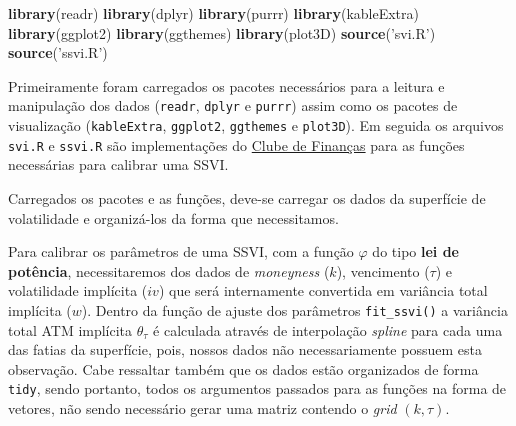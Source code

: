 \documentclass[]{book}
\newenvironment{Shaded}{\begin{snugshade}}{\end{snugshade}}
\newcommand{\KeywordTok}[1]{\textcolor[rgb]{0.13,0.29,0.53}{\textbf{#1}}}
\newcommand{\DataTypeTok}[1]{\textcolor[rgb]{0.13,0.29,0.53}{#1}}
\newcommand{\DecValTok}[1]{\textcolor[rgb]{0.00,0.00,0.81}{#1}}
\newcommand{\StringTok}[1]{\textcolor[rgb]{0.31,0.60,0.02}{#1}}
\newcommand{\OperatorTok}[1]{\textcolor[rgb]{0.81,0.36,0.00}{\textbf{#1}}}
\newcommand{\NormalTok}[1]{#1}
\theoremstyle{definition}
\theoremstyle{definition}
\theoremstyle{definition}
\theoremstyle{remark}
\begin{document}
\begin{Shaded}
\begin{Highlighting}[]
\KeywordTok{library}\NormalTok{(readr)}
\KeywordTok{library}\NormalTok{(dplyr)}
\KeywordTok{library}\NormalTok{(purrr)}
\KeywordTok{library}\NormalTok{(kableExtra)}
\KeywordTok{library}\NormalTok{(ggplot2)}
\KeywordTok{library}\NormalTok{(ggthemes)}
\KeywordTok{library}\NormalTok{(plot3D)}
\KeywordTok{source}\NormalTok{(}\StringTok{'svi.R'}\NormalTok{)}
\KeywordTok{source}\NormalTok{(}\StringTok{'ssvi.R'}\NormalTok{)}
\end{Highlighting}
\end{Shaded}

Primeiramente foram carregados os pacotes necessários para a leitura e
manipulação dos dados (\texttt{readr}, \texttt{dplyr} e \texttt{purrr})
assim como os pacotes de visualização (\texttt{kableExtra},
\texttt{ggplot2}, \texttt{ggthemes} e \texttt{plot3D}). Em seguida os
arquivos \texttt{svi.R} e \texttt{ssvi.R} são implementações do
\href{http://clubedefinancas.com.br/}{Clube de Finanças} para as funções
necessárias para calibrar uma SSVI.

Carregados os pacotes e as funções, deve-se carregar os dados da
superfície de volatilidade e organizá-los da forma que necessitamos.

\begin{Shaded}
\end{Shaded}

Para calibrar os parâmetros de uma SSVI, com a função \(\varphi\) do
tipo \textbf{lei de potência}, necessitaremos dos dados de
\emph{moneyness} (\(k\)), vencimento (\(\tau\)) e volatilidade implícita
(\(iv\)) que será internamente convertida em variância total implícita
(\(w\)). Dentro da função de ajuste dos parâmetros \texttt{fit\_ssvi()}
a variância total ATM implícita \(\theta_\tau\) é calculada através de
interpolação \emph{spline} para cada uma das fatias da superfície, pois,
nossos dados não necessariamente possuem esta observação. Cabe ressaltar
também que os dados estão organizados de forma \texttt{tidy}, sendo
portanto, todos os argumentos passados para as funções na forma de
vetores, não sendo necessário gerar uma matriz contendo o \emph{grid}
\((k, \tau)\).
\end{document}
